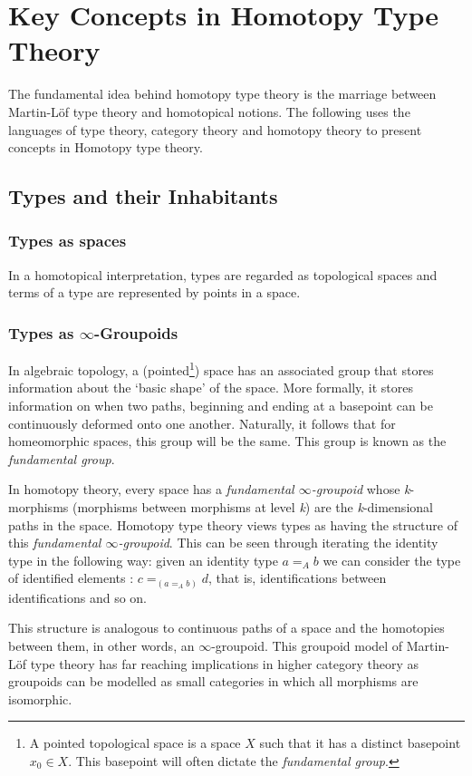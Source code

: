 \documentclass[12pt]{report}
\begin{document}
\pagebreak

\section{Key Concepts in Homotopy Type Theory}
The fundamental idea behind homotopy type theory is the marriage between Martin-L\"of type theory and homotopical notions. The following uses the languages of type theory, category theory and homotopy theory to present concepts in Homotopy type theory. 
\subsection{Types and their Inhabitants}
\subsubsection{Types as spaces}
In a homotopical interpretation, types are regarded as topological spaces and terms of a type are represented by points in a space.
\subsubsection{Types as $\infty$-Groupoids}
In algebraic topology, a (pointed\footnote{

A pointed topological space is a space $X$ such that it has a distinct basepoint $x_0 \in X$. This basepoint will often dictate the \textit{fundamental group}.

}) space has an associated group that stores information about the `basic shape' of the space. More formally, it stores information on when two paths, beginning and ending at a basepoint can be continuously deformed onto one another. Naturally, it follows that for homeomorphic spaces, this group will be the same. This group is known as the \textit{fundamental group}.

In homotopy theory, every space has a \textit{fundamental $\infty$-groupoid} whose \textit{k}-morphisms (morphisms between morphisms at level \textit{k}) are the \textit{k}-dimensional paths in the space. Homotopy type theory views types as having the structure of this \textit{fundamental $\infty$-groupoid}. This can be seen through iterating the identity type in the following way: given an identity type $a =_A b$ we can consider the type of identified elements : $c =_{(a =_A b)} d$, that is, identifications between identifications and so on.

This structure is analogous to continuous paths of a space and the homotopies between them, in other words, an $\infty$-groupoid. This groupoid model of Martin-L\"of type theory has far reaching implications in higher category theory as groupoids can be modelled as small categories in which all morphisms are isomorphic.
\end{document}
